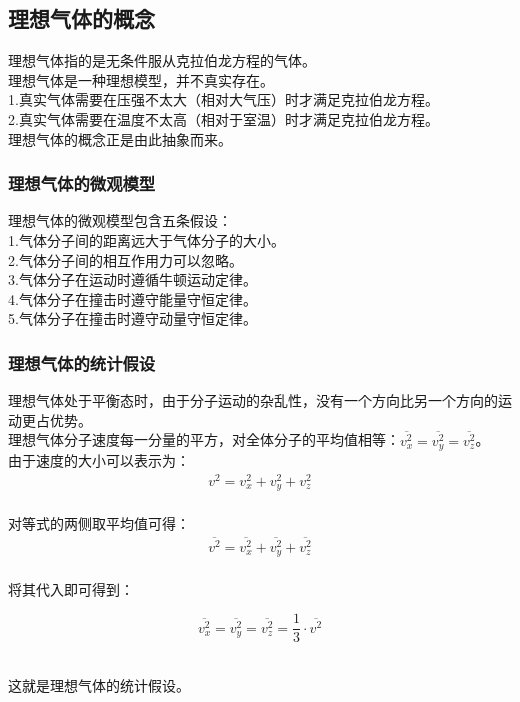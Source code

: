 \documentclass[UTF8]{ctexart}
\begin{document}
\newpage

\subsection{理想气体的概念}
    理想气体指的是无条件服从克拉伯龙方程的气体。\\[3mm]
    理想气体是一种理想模型，并不真实存在。\\[3mm]
    1.真实气体需要在压强不太大（相对大气压）时才满足克拉伯龙方程。\\[3mm]
    2.真实气体需要在温度不太高（相对于室温）时才满足克拉伯龙方程。\\[3mm]
    理想气体的概念正是由此抽象而来。

\subsubsection{理想气体的微观模型}
    理想气体的微观模型包含五条假设：\\[3mm]
    1.气体分子间的距离远大于气体分子的大小。\\[3mm]
    2.气体分子间的相互作用力可以忽略。\\[3mm]
    3.气体分子在运动时遵循牛顿运动定律。\\[3mm]
    4.气体分子在撞击时遵守能量守恒定律。\\[3mm]
    5.气体分子在撞击时遵守动量守恒定律。

\subsubsection{理想气体的统计假设}
    \setcounter{equation}{0}
    理想气体处于平衡态时，由于分子运动的杂乱性，没有一个方向比另一个方向的运动更占优势。\\[3mm]
    理想气体分子速度每一分量的平方，对全体分子的平均值相等：$\overline{v_x^2}=\overline{v_y^2}=\overline{v_z^2}$。\\[5mm]
    由于速度的大小可以表示为：
    \begin{align}
        v^2=v_x^2+v_y^2+v_z^2
    \end{align}\\
    对等式的两侧取平均值可得：
    \begin{align}
        \overline{v^2}=\overline{v_x^2}+\overline{v_y^2}+\overline{v_z^2}
    \end{align}\\
    将其代入即可得到：
    \begin{large}
        \begin{equation*}
            \overline{v_x^2}=\overline{v_y^2}=\overline{v_z^2}=\frac{1}{3}\cdot\overline{v^2}
        \end{equation*}
    \end{large}\\
    这就是理想气体的统计假设。
\end{document}
